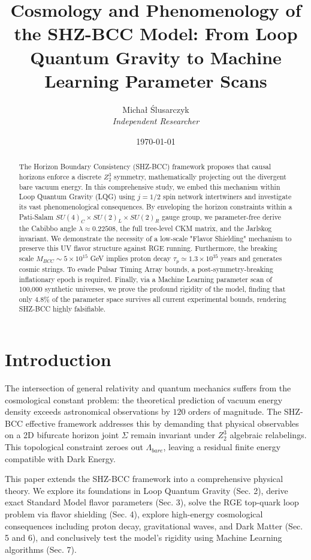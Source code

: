 \documentclass[11pt,a4paper]{article}
\title{\LARGE \textbf{Cosmology and Phenomenology of the SHZ-BCC Model: From Loop Quantum Gravity to Machine Learning Parameter Scans}}
\author{\large Micha\l{} \'Slusarczyk \\ \small{\textit{Independent Researcher}}}
\date{\today}
\begin{document}
\maketitle

\begin{abstract}
The Horizon Boundary Consistency (SHZ-BCC) framework proposes that causal horizons enforce a discrete $Z_2^3$ symmetry, mathematically projecting out the divergent bare vacuum energy. In this comprehensive study, we embed this mechanism within Loop Quantum Gravity (LQG) using $j=1/2$ spin network intertwiners and investigate its vast phenomenological consequences. By enveloping the horizon constraints within a Pati-Salam $SU(4)_C \times SU(2)_L \times SU(2)_R$ gauge group, we parameter-free derive the Cabibbo angle $\lambda \approx 0.22508$, the full tree-level CKM matrix, and the Jarlskog invariant. We demonstrate the necessity of a low-scale "Flavor Shielding" mechanism to preserve this UV flavor structure against RGE running. Furthermore, the breaking scale $M_{BCC} \sim 5 \times 10^{15}$ GeV implies proton decay $\tau_p \simeq 1.3 \times 10^{35}$ years and generates cosmic strings. To evade Pulsar Timing Array bounds, a post-symmetry-breaking inflationary epoch is required. Finally, via a Machine Learning parameter scan of 100,000 synthetic universes, we prove the profound rigidity of the model, finding that only $4.8\%$ of the parameter space survives all current experimental bounds, rendering SHZ-BCC highly falsifiable.
\end{abstract}

\tableofcontents
\vspace{1cm}

\section{Introduction}
The intersection of general relativity and quantum mechanics suffers from the cosmological constant problem: the theoretical prediction of vacuum energy density exceeds astronomical observations by $120$ orders of magnitude. The SHZ-BCC effective framework addresses this by demanding that physical observables on a 2D bifurcate horizon joint $\Sigma$ remain invariant under $Z_2^3$ algebraic relabelings. This topological constraint zeroes out $\Lambda_{bare}$, leaving a residual finite energy compatible with Dark Energy.

This paper extends the SHZ-BCC framework into a comprehensive physical theory. We explore its foundations in Loop Quantum Gravity (Sec. 2), derive exact Standard Model flavor parameters (Sec. 3), solve the RGE top-quark loop problem via flavor shielding (Sec. 4), explore high-energy cosmological consequences including proton decay, gravitational waves, and Dark Matter (Sec. 5 and 6), and conclusively test the model's rigidity using Machine Learning algorithms (Sec. 7).
\end{document}
